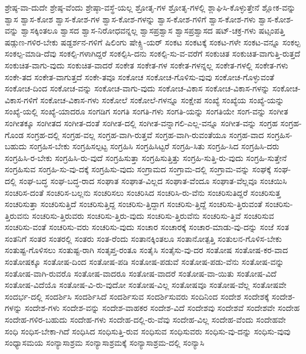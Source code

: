 {ಶ್ರೇಷ್ಠ-ವಾ-ದುದೇ
ಶ್ರೇಷ್ಠ-ವೆಂದು
ಶ್ರೇಷ್ಠಾ-ವಸ್ಥೆ-ಯಲ್ಲ
ಶ್ರೋತೃ-ಗಳ
ಶ್ರೋತೃ-ಗಳಲ್ಲಿ
ಶ್ಲಾಘಿಸಿ-ಕೊಳ್ಳುತ್ತೇನೆ
ಶ್ಲೋಕ-ವನ್ನು
ಶ್ವಾಸ
ಶ್ವಾಸ-ಕೋಶ
ಶ್ವಾಸ-ಕೋಶ-ಗಳ
ಶ್ವಾಸ-ಕೋಶ-ಗಳನ್ನು
ಶ್ವಾಸ-ಕೋಶ-ಗಳಿಗೆ
ಶ್ವಾಸ-ಕೋಶ-ಗಳು
ಶ್ವಾಸ-ಕೋಶ-ವನ್ನು
ಶ್ವಾಸಕ್ಕಿಂತಲೂ
ಶ್ವಾಸದ
ಶ್ವಾಸ-ನಿರೋಧವನ್ನಲ್ಲ
ಶ್ವಾಸಪ್ರಶ್ವಾಸ
ಶ್ವಾಸಪ್ರಶ್ವಾಸದ
ಷಟ್-ಚಕ್ರ-ಗಳು
ಷಟ್ಸಂಪತ್ತಿ
ಷಡ್ಗುಣ-ಗಳಿರ-ಬೇಕು
ಷಡ್ದರ್ಶನ-ಗಳಿಗೆ
ಷಿಲಿಂಗು
ಷೇಕ್ಸ್ಪಿ-ಯರ್
ಸಂಕಟ
ಸಂಕಟಕ್ಕೆ
ಸಂಕಟ-ಗಳೇ
ಸಂಕಟ-ವನ್ನೂ
ಸಂಕಲ್ಪ
ಸಂಕಲ್ಪ-ಮಾಡಿ-ದೆವು
ಸಂಕಲ್ಪಿ-ಗಳಾಗಿದ್ದರೆ
ಸಂಕಲ್ಪಿಸಿ-ದನು
ಸಂಕಲ್ಪಿ-ಸು-ವ-ವರೆಗೆ
ಸಂಕುಚಿತ
ಸಂಕುಚಿತ-ವಾಗುತ್ತಿ-ರುತ್ತದೆ
ಸಂಕುಚಿತ-ವಾಗು-ವುದು
ಸಂಕುಚಿತ-ವಾದರೆ
ಸಂಕೇತ
ಸಂಕೇತ-ಗಳ
ಸಂಕೇತ-ಗಳನ್ನಲ್ಲ
ಸಂಕೇತ-ಗಳಲ್ಲಿ
ಸಂಕೇತ-ಗಳು
ಸಂಕೇ-ತದ
ಸಂಕೇತ-ವಾಗುತ್ತದೆ
ಸಂಕೇ-ತವೂ
ಸಂಕೋಚ
ಸಂಕೋಚ-ಗೊಳಿಸು-ವುವು
ಸಂಕೋಚ-ಗೊಳ್ಳುವಂತೆ
ಸಂಕೋಚ-ದಿಂದ
ಸಂಕೋಚ-ವನ್ನು
ಸಂಕೋಚ-ವಾಗು-ವುದು
ಸಂಕೋಚ-ವಿಕಾಸ
ಸಂಕೋಚ-ವಿಕಾಸ-ಗಳನ್ನು
ಸಂಕೋಚ-ವಿಕಾಸ-ಗಳಿಗೆ
ಸಂಕೋಚ-ವಿಕಾಸ-ಗಳು
ಸಂಕೋಲೆ
ಸಂಕೋಲೆ-ಗಳನ್ನೂ
ಸಂಕ್ಷೇಪ
ಸಂಖ್ಯೆ
ಸಂಖ್ಯೆಯ
ಸಂಖ್ಯೆ-ಯನ್ನು
ಸಂಖ್ಯೆ-ಯಲ್ಲಿ
ಸಂಖ್ಯೆ-ಯಾದರೂ
ಸಂಗಡಿಗ
ಸಂಗತಿ
ಸಂಗತಿ-ಗಳು
ಸಂಗತಿ-ಯನ್ನು
ಸಂಗತಿಯೇ
ಸಂಗ-ವನ್ನು
ಸಂಗೀತ
ಸಂಗೀತಕ್ಕೂ
ಸಂಗೀತದ
ಸಂಗೀತ-ದಂತೆ
ಸಂಗೀತ-ದಲ್ಲಿ
ಸಂಗೀತ-ವನ್ನಾಗಲಿ-ಎಲ್ಲ-ವನ್ನೂ
ಸಂಗೀತ-ವನ್ನು
ಸಂಗ್ರಹ
ಸಂಗ್ರಹ-ಗೊಂಡ
ಸಂಗ್ರಹ-ದಲ್ಲಿ
ಸಂಗ್ರಹ-ವಲ್ಲ
ಸಂಗ್ರಹ-ವಾಗಿ-ರುತ್ತವೆ
ಸಂಗ್ರಹ-ವಾಗಿ-ರುವಂತೆಯೂ
ಸಂಗ್ರಹ-ವಾದ
ಸಂಗ್ರಹಿಸ-ಬಹುದು
ಸಂಗ್ರಹಿಸ-ಬೇಕು
ಸಂಗ್ರಹಿಸಲ್ಪಟ್ಟ
ಸಂಗ್ರಹಿಸಿ
ಸಂಗ್ರಹಿಸಿಟ್ಟರೆ
ಸಂಗ್ರಹಿ-ಸಿತು
ಸಂಗ್ರಹಿ-ಸಿದ
ಸಂಗ್ರಹಿಸಿ-ದರು
ಸಂಗ್ರಹಿಸಿ-ರ-ಬೇಕು
ಸಂಗ್ರಹಿಸಿ-ರು-ವುದೆ
ಸಂಗ್ರಹಿಸುತ್ತಾ
ಸಂಗ್ರಹಿಸುತ್ತಿತ್ತು
ಸಂಗ್ರಹಿ-ಸುತ್ತಿ-ರು-ವುದು
ಸಂಗ್ರಹಿ-ಸುತ್ತೇನೆ
ಸಂಗ್ರಹಿಸುವ
ಸಂಗ್ರಹಿ-ಸು-ವು-ದಕ್ಕೆ
ಸಂಗ್ರಹಿಸು-ವುದು
ಸಂಗ್ರಾಮದ
ಸಂಗ್ರಾಮ-ದಲ್ಲಿ
ಸಂಗ್ರಾಮ-ವನ್ನು
ಸಂಘಕ್ಕೆ
ಸಂಘ-ದಲ್ಲಿ
ಸಂಘ-ಬದ್ಧ
ಸಂಘ-ಬದ್ಧ-ರಾದ
ಸಂಘಾತ
ಸಂಘಾತ-ವಿಲ್ಲದ
ಸಂಘಾತ-ವೆಂದೂ
ಸಂಘಾತ-ವೆಲ್ಲವೂ
ಸಂಚಯಿಸಿ
ಸಂಚರಿಸ-ದಂತೆ
ಸಂಚರಿಸ-ಬಲ್ಲನು
ಸಂಚರಿಸಲು
ಸಂಚರಿಸಿದ
ಸಂಚರಿಸಿ-ರು-ವೆನು
ಸಂಚರಿಸುತಿದ್ದರೆ
ಸಂಚರಿಸುತ್ತ
ಸಂಚರಿಸುತ್ತಾ
ಸಂಚರಿಸುತ್ತಿದೆ
ಸಂಚರಿಸುತ್ತಿದ್ದ
ಸಂಚರಿಸು-ತ್ತಿದ್ದಾಗ
ಸಂಚರಿಸು-ತ್ತಿದ್ದೆ
ಸಂಚರಿಸು-ತ್ತಿರುವಂತೆ
ಸಂಚರಿಸು-ತ್ತಿರುವನು
ಸಂಚರಿಸು-ತ್ತಿರುವರು
ಸಂಚರಿಸು-ತ್ತಿರು-ವುದು
ಸಂಚರಿಸು-ತ್ತಿರುವೆನು
ಸಂಚರಿಸು-ತ್ತಿವೆ
ಸಂಚರಿಸುವ
ಸಂಚರಿಸು-ವಂತೆ
ಸಂಚರಿಸು-ವರು
ಸಂಚರಿಸು-ವುದು
ಸಂಚಾರ
ಸಂಚಾರಕ್ಕೆ
ಸಂಚಾರ-ಮಾಡು-ವು-ದನ್ನು
ಸಂಜೆ
ಸಂತ
ಸಂತನಿಗೆ
ಸಂತರ
ಸಂತರಲ್ಲಿ
ಸಂತರು
ಸಂತ-ರೆಂದು
ಸಂತಾನಕ್ಕಿಂತಲೂ
ಸಂತಾನೋತ್ಪತ್ತಿ
ಸಂತುಲನ-ಗೊಳಿಸ-ಬೇಕು
ಸಂತುಷ್ಟ-ಗೊಳಿಸಲು
ಸಂತುಷ್ಟ-ರಾಗಿ
ಸಂತೃಪ್ತ-ರಂತೂ
ಸಂತೈಸಿ
ಸಂತೈಸು-ವು-ದರ
ಸಂತೋಷ
ಸಂತೋಷ-ಕರ-ವಾದ
ಸಂತೋಷಕ್ಕೂ
ಸಂತೋಷ-ದಿಂದ
ಸಂತೋಷ-ಪಡಿ
ಸಂತೋಷ-ಪಡುವೆ
ಸಂತೋಷ-ಪಡು-ವೆನು
ಸಂತೋಷ-ವನ್ನು
ಸಂತೋಷ-ವಾಗಿ-ರುವರೊ
ಸಂತೋಷ-ವಾದರೂ
ಸಂತೋಷ-ವಾದರೆ
ಸಂತೋಷ-ವಾ-ಯಿತು
ಸಂತೋಷ-ವಿದೆ
ಸಂತೋಷ-ವಿದೆಯೊ
ಸಂತೋಷ-ವಿ-ರು-ವುದೋ
ಸಂತೋಷ-ವಿಲ್ಲ
ಸಂತೋಷವೂ
ಸಂತೋಷ-ವೆಲ್ಲ
ಸಂತೋಷವೇ
ಸಂದರ್ಭ-ದಲ್ಲಿ
ಸಂದರ್ಶಿಸಿ
ಸಂದರ್ಶಿಸಿದೆ
ಸಂದರ್ಶಿಸುವ
ಸಂದರ್ಶಿಸುವರು
ಸಂದಿನಿಂದ
ಸಂದೇಶ
ಸಂದೇಶಕ್ಕೆ
ಸಂದೇಶ-ಗಳನ್ನು
ಸಂದೇಶ-ಗಳು
ಸಂದೇಶ-ವನ್ನು
ಸಂದೇಶ-ವಾಹಕರ
ಸಂದೇಶ-ವಿದೆ
ಸಂದೇಶವು
ಸಂದೇಶವೆ
ಸಂದೇಶವೇ
ಸಂದೇಹ
ಸಂದೇಹ-ಗಳಿರ-ಬಹುದು
ಸಂದೇಹ-ಗಳು
ಸಂದೇಹ-ದಲ್ಲಿ-ರು-ವೆವು
ಸಂದೇಹ-ವಿಲ್ಲ
ಸಂದೇಹ-ವೆಂದು
ಸಂದೇಹವೇ
ಸಂಧಿ
ಸಂಧಿಸ-ಬೇಕಾ-ಗಿದೆ
ಸಂಧಿಸಿದ
ಸಂಧಿಸುತ್ತಿ-ರುವ
ಸಂಧಿಸುವ
ಸಂಧಿಸುವರು
ಸಂಧಿಸು-ವು-ದನ್ನು
ಸಂಧಿಸು-ವುವು
ಸಂಧ್ಯಾಸಮಯ
ಸಂನ್ಯಾಸಾಶ್ರಮ
ಸಂನ್ಯಾಸಾಶ್ರಮಕ್ಕೆ
ಸಂನ್ಯಾಸಾಶ್ರಮ-ದಲ್ಲಿ
ಸಂನ್ಯಾಸಿ
}
